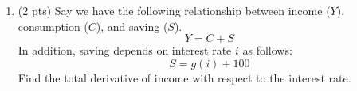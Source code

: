 \documentclass{./../../Latex/tests}
\begin{document}
\begin{enumerate}
\vspace{2cm}

\item (2 pts) Say we have the following relationship between income ($Y$), consumption ($C$), and saving ($S$). 
$$ Y= C+S$$
In addition, saving depends on interest rate $i$ as follows:
$$ S = g(i)+100 $$
Find the total derivative of income with respect to the interest rate. 


\end{enumerate}
\end{document}

